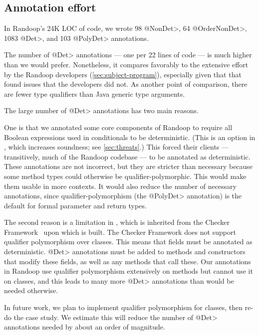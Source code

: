 \subsection{Annotation effort}

In Randoop's 24K LOC of code, we wrote
98 \<@NonDet>,
64 \<@OrderNonDet>,
1083 \<@Det>,
and 103 \<@PolyDet> annotations.

The number of \<@Det> annotations --- one per 22 lines of code --- is much
higher than we would prefer.
Nonetheless, it compares favorably to the
extensive effort by the Randoop developers (\cref{sec:subject-program}),
especially given that that \theDeterminismChecker found issues that the
developers did not.
As another point of comparison,
there are fewer type qualifiers than Java generic type arguments.

The large number of \<@Det> annotations has two main reasons.

One is that we annotated some core components of Randoop to require all
Boolean expressions used in conditionals to be deterministic.  (This is an
option in \theDeterminismCheckerImplementation, which increases soundness;
see \cref{sec:threats}.)  This forced
their clients --- transitively, much of the Randoop codebase --- to be
annotated as deterministic.
These annotations are not incorrect, but they are stricter than necessary
because some method types could otherwise be qualifier-polymorphic.
This would make them usable in more contexts.  It would also reduce the
number of necessary annotations, since qualifier-polymorphism (the
\<@PolyDet> annotation) is the default for
formal parameter and return types.

The second reason is a limitation in \theDeterminismCheckerImplementation,
which is inherited from the Checker Framework~\cite{checker-framework-tool} upon which
\theDeterminismChecker is built.
The Checker Framework does not support qualifier polymorphism over
classes.  This means that fields must be annotated as deterministic.
\<@Det> annotations must be added to methods and constructors that modify these
fields, as well as any methods that call these.
Our annotations in
Randoop use qualifier polymorphism extensively on methods but cannot use it
on classes, and this leads to many more \<@Det> annotations than would be
needed otherwise.

In future work, we plan to implement qualifier polymorphism for classes,
then re-do the case study.  We estimate this will reduce the number of
\<@Det> annotations needed by about an order of magnitude. 


